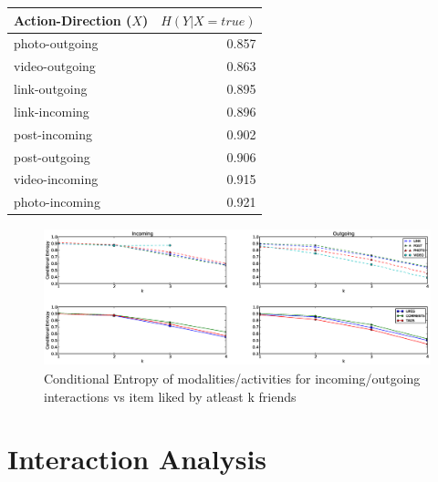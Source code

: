 \begin{table}
{\begin{tabular}{| >{\small}l | >{\small}r | }
                \hline	
		\textbf{Action-Direction} ($X$) & $H(Y|X=true)$ \\
		\hline
		photo-outgoing & 0.857 \\
		video-outgoing & 0.863 \\
		link-outgoing & 0.895 \\
		link-incoming & 0.896 \\
		post-incoming & 0.902 \\
		post-outgoing & 0.906 \\
		video-incoming & 0.915 \\
		photo-incoming & 0.921 \\
		\hline
				
	\end{tabular}}
\end{table}

\begin{figure}[tbp!]
\centering
\includegraphics[width=160mm, height=40mm]{data/plots/vsk/ModalityActionsvsKFriends.eps}
\caption{Conditional Entropy  of modalities/activities for incoming/outgoing interactions vs item liked by atleast k friends}
\label{Fig2}
\end{figure}

\section{Interaction Analysis}


